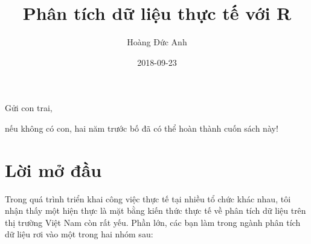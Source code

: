 \documentclass[]{krantz}
\title{Phân tích dữ liệu thực tế với R}
\author{Hoàng Đức Anh}
\date{2018-09-23}
\theoremstyle{definition}
\theoremstyle{definition}
\theoremstyle{definition}
\theoremstyle{remark}
\begin{document}
\maketitle


\thispagestyle{empty}

\begin{center}
Gửi con trai,

nếu không có con, hai năm trước bố đã có thể hoàn thành cuốn sách này!
\end{center}

\setlength{\abovedisplayskip}{-5pt}
\setlength{\abovedisplayshortskip}{-5pt}

{
\hypersetup{linkcolor=}
\setcounter{tocdepth}{2}
\tableofcontents
}
\listoftables
\listoffigures
\hypertarget{li-m-u}{%
\chapter*{Lời mở đầu}\label{li-m-u}}


Trong quá trình triển khai công việc thực tế tại nhiều tổ chức khác
nhau, tôi nhận thấy một hiện thực là mặt bằng kiến thức thực tế về phân
tích dữ liệu trên thị trường Việt Nam còn rất yếu. Phần lớn, các bạn làm
trong ngành phân tích dữ liệu rơi vào một trong hai nhóm sau:
\end{document}
